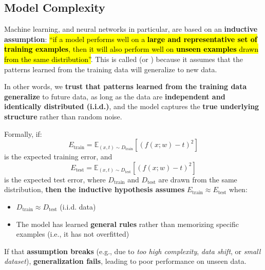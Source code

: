 \subsection{Model Complexity}\label{sec:nn-model-complexity}

Machine learning, and neural networks in particular, are based on an \textbf{inductive assumption}: \hl{``if a model performs well on a \textbf{large and representative set of training examples}, then it will also perform well on \textbf{unseen examples} drawn from the same distribution''}. This is called  (or ) because it assumes that the patterns learned from the training data will generalize to new data.\label{def:inductive-hypothesis}

\highspace
In other words, we \textbf{trust that patterns learned from the training data generalize} to future data, as long as the data are \textbf{independent and identically distributed (i.i.d.)}, and the model captures the \textbf{true underlying structure} rather than random noise.

\highspace
Formally, if:
\begin{equation*}
    E_{\text{train}} = \mathbb{E}_{\left(x, t\right) \sim D_{\text{train}}} \left[\left(f(x; w) - t\right)^2\right]
\end{equation*}
is the expected training error, and
\begin{equation*}
    E_{\text{test}} = \mathbb{E}_{\left(x, t\right) \sim D_{\text{test}}} \left[\left(f(x; w) - t\right)^2\right]
\end{equation*}
is the expected test error, where \(D_{\text{train}}\) and \(D_{\text{test}}\) are drawn from the same distribution, \textbf{then the inductive hypothesis assumes} $E_{\text{train}} \approx E_{\text{test}}$ when:
\begin{itemize}
    \item $D_{\text{train}} \approx D_{\text{test}}$ (i.i.d. data)
    \item The model has learned \textbf{general rules} rather than memorizing specific examples (i.e., it has not overfitted)
\end{itemize}
If that \textbf{assumption breaks} (e.g., due to \emph{too high complexity}, \emph{data shift}, or \emph{small dataset}), \textbf{generalization fails}, leading to poor performance on unseen data.

